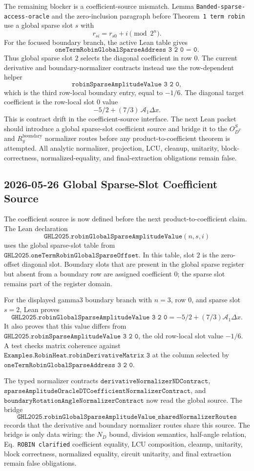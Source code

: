 The remaining blocker is a coefficient-source mismatch.  Lemma
\texttt{Banded-sparse-access-oracle} and the zero-inclusion paragraph before
Theorem~\texttt{1 term robin} use a global sparse slot \(s\) with
\[
  r_{si}=r_{s0}+i \pmod{2^n}.
\]
For the focused boundary branch, the active Lean table gives
\[
  \texttt{oneTermRobinGlobalSparseAddress 3 2 0 = 0}.
\]
Thus global sparse slot \(2\) selects the diagonal coefficient in row \(0\).
The current derivative and boundary-normalizer contracts instead use the
row-dependent helper
\[
  \texttt{robinSparseAmplitudeValue 3 2 0},
\]
which is the third row-local boundary entry, equal to \(-1/6\).  The diagonal
target coefficient is the row-local slot \(0\) value
\[
  -5/2 + (7/3)\,\mathcal{A}_1\Delta x.
\]
This is contract drift in the coefficient-source interface.  The next Lean
packet should introduce a global sparse-slot coefficient source and bridge it
to the \(O_{D^T}^{S}\) and \(R_y^{\mathrm{boundary}}\) normalizer routes before
any product-to-coefficient theorem is attempted.  All analytic normalizer,
projection, LCU, cleanup, unitarity, block-correctness, normalized-equality,
and final-extraction obligations remain false.

\subsection{2026-05-26 Global Sparse-Slot Coefficient Source}

The coefficient source is now defined before the next product-to-coefficient
claim.  The Lean declaration
\[
  \texttt{GHL2025.robinGlobalSparseAmplitudeValue}(n,s,i)
\]
uses the global sparse-slot table from
\(\texttt{GHL2025.oneTermRobinGlobalSparseOffset}\).  In this table, slot
\(2\) is the zero-offset diagonal slot.  Boundary slots that are present in
the global sparse register but absent from a boundary row are assigned
coefficient \(0\); the sparse slot remains part of the register domain.

For the displayed gamma3 boundary branch with \(n=3\), row \(0\), and sparse
slot \(s=2\), Lean proves
\[
  \texttt{GHL2025.robinGlobalSparseAmplitudeValue 3 2 0}
  =
  -5/2 + (7/3)\mathcal{A}_1\Delta x.
\]
It also proves that this value differs from
\(\texttt{GHL2025.robinSparseAmplitudeValue 3 2 0}\), the old row-local slot
value \(-1/6\).  A test checks matrix coherence against
\(\texttt{Examples.RobinHeat.robinDerivativeMatrix 3}\) at the column selected
by \(\texttt{oneTermRobinGlobalSparseAddress 3 2 0}\).

The typed normalizer contracts
\(\texttt{derivativeNormalizerNDContract}\),
\(\texttt{sparseAmplitudeOracleDTCoefficientNormalizerContract}\), and
\(\texttt{boundaryRotationAngleNormalizerContract}\) now read the global source.
The bridge
\[
  \texttt{GHL2025.robinGlobalSparseAmplitudeValue\_sharedNormalizerRoutes}
\]
records that the derivative and boundary normalizer routes share this source.
The bridge is only data wiring: the \(N_D\) bound, division semantics,
half-angle relation, Eq.~\texttt{ROBIN clarified} coefficient equality, LCU
composition, cleanup, unitarity, block correctness, normalized equality,
circuit unitarity, and final extraction remain false obligations.

